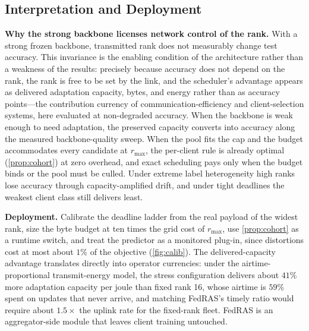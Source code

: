 \documentclass[a4paper,fleqn]{cas-dc}
\begin{document}
\subsection{Interpretation and Deployment}
\textbf{Why the strong backbone licenses network control of the rank.} With a strong frozen backbone, transmitted rank does not measurably change test accuracy. This invariance is the enabling condition of the architecture rather than a weakness of the results: precisely because accuracy does not depend on the rank, the rank is free to be set by the link, and the scheduler's advantage appears as delivered adaptation capacity, bytes, and energy rather than as accuracy points---the contribution currency of communication-efficiency and client-selection systems, here evaluated at non-degraded accuracy. When the backbone is weak enough to need adaptation, the preserved capacity converts into accuracy along the measured backbone-quality sweep. When the pool fits the cap and the budget accommodates every candidate at $r_{\max}$, the per-client rule is already optimal (\cref{prop:cohort}) at zero overhead, and exact scheduling pays only when the budget binds or the pool must be culled. Under extreme label heterogeneity high ranks lose accuracy through capacity-amplified drift, and under tight deadlines the weakest client class still delivers least.
\par
\textbf{Deployment.} Calibrate the deadline ladder from the real payload of the widest rank, size the byte budget at ten times the grid cost of $r_{\max}$, use \cref{prop:cohort} as a runtime switch, and treat the predictor as a monitored plug-in, since distortions cost at most about $1\%$ of the objective (\cref{fig:calib}). The delivered-capacity advantage translates directly into operator currencies: under the airtime-proportional transmit-energy model, the stress configuration delivers about $41\%$ more adaptation capacity per joule than fixed rank 16, whose airtime is $59\%$ spent on updates that never arrive, and matching FedRAS's timely ratio would require about $1.5\times$ the uplink rate for the fixed-rank fleet. FedRAS is an aggregator-side module that leaves client training untouched.
\par
\end{document}
